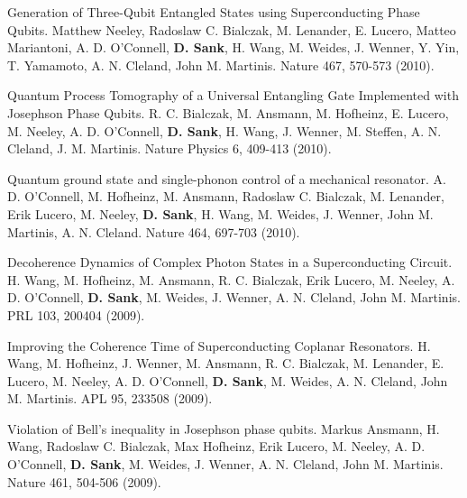 \documentclass[margin=2cm,line]{res}
\begin{document}
\begin{resume}
\begin{list3}
\item Generation of Three-Qubit Entangled States using Superconducting Phase Qubits. Matthew Neeley, Radoslaw C. Bialczak, M. Lenander, E. Lucero, Matteo Mariantoni, A. D. O'Connell, \textbf{D. Sank}, H. Wang, M. Weides, J. Wenner, Y. Yin, T. Yamamoto, A. N. Cleland, John M. Martinis. Nature 467, 570-573 (2010). \\

\item Quantum Process Tomography of a Universal Entangling Gate Implemented with Josephson Phase Qubits. R. C. Bialczak, M. Ansmann, M. Hofheinz, E. Lucero, M. Neeley, A. D. O'Connell, \textbf{D. Sank}, H. Wang, J. Wenner, M. Steffen, A. N. Cleland, J. M. Martinis. Nature Physics 6, 409-413 (2010). \\

\end{list3}

\pagebreak

\begin{list3}

\item Quantum ground state and single-phonon control of a mechanical resonator. A. D. O'Connell, M. Hofheinz, M. Ansmann, Radoslaw C. Bialczak, M. Lenander, Erik Lucero, M. Neeley, \textbf{D. Sank}, H. Wang, M. Weides, J. Wenner, John M. Martinis, A. N. Cleland. Nature 464, 697-703 (2010). \\

\item Decoherence Dynamics of Complex Photon States in a Superconducting Circuit. H. Wang, M. Hofheinz, M. Ansmann, R. C. Bialczak, Erik Lucero, M. Neeley, A. D. O'Connell, \textbf{D. Sank}, M. Weides, J. Wenner, A. N. Cleland, John M. Martinis. PRL 103, 200404 (2009). \\

\item Improving the Coherence Time of Superconducting Coplanar Resonators. H. Wang, M. Hofheinz, J. Wenner, M. Ansmann, R. C. Bialczak, M. Lenander, E. Lucero, M. Neeley, A. D. O'Connell, \textbf{D. Sank}, M. Weides, A. N. Cleland, John M. Martinis. APL 95, 233508 (2009). \\

\item Violation of Bell's inequality in Josephson phase qubits. Markus Ansmann, H. Wang, Radoslaw C. Bialczak, Max Hofheinz, Erik Lucero, M. Neeley, A. D. O'Connell, \textbf{D. Sank}, M. Weides, J. Wenner, A. N. Cleland, John M. Martinis. Nature 461, 504-506 (2009).


\end{list3}
\end{resume}
\end{document}
